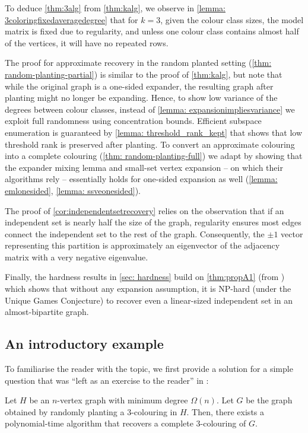 To deduce \cref{thm:3alg} from \cref{thm:kalg}, we observe in \cref{lemma: 3coloringfixedaveragedegree} that for $k=3$, given the colour class sizes, the model matrix is fixed due to regularity, and unless one colour class contains almost half of the vertices, it will have no repeated rows. 

The proof for approximate recovery in the random planted setting (\cref{thm: random-planting-partial}) is similar to the proof of \cref{thm:kalg}, but note that while the original graph is a one-sided expander, the resulting graph after planting might no longer be expanding. Hence, to show low variance of the degrees between colour classes, instead of \cref{lemma: expansionimpliesvariance} we exploit full randomness using concentration bounds. Efficient subspace enumeration is guaranteed by \cref{lemma: threshold_rank_kept} that shows that low threshold rank is preserved after planting. To convert an approximate colouring into a complete colouring (\cref{thm: random-planting-full}) we adapt \cite{MR3536556-David16} by showing that the expander mixing lemma and small-set vertex expansion -- on which their algorithms rely -- essentially holds for one-sided expansion as well (\cref{lemma: emlonesided}, \cref{lemma: ssveonesided}).

The proof of \cref{cor:independentsetrecovery} relies on the observation that if an independent set is nearly half the size of the graph, regularity ensures most edges connect the independent set to the rest of the graph. Consequently, the $\pm 1$ vector representing this partition is approximately an eigenvector of the adjacency matrix with a very negative eigenvalue.

Finally, the hardness results in \cref{sec: hardness} build on \cref{thm:propA1} (from \cite{bafna-hsieh-kothari}) which shows that without any expansion assumption, it is NP-hard (under the Unique Games Conjecture) to recover even a linear-sized independent set in an almost-bipartite graph.

\subsection{An introductory example}

To familiarise the reader with the topic, we first provide a solution for a simple question that was ``left as an exercise to the reader'' in \cite{MR3536556-David16}:

\begin{lemma}
    \label{lemma: lineardegree}
    Let $H$ be an $n$-vertex graph with minimum degree $\Omega(n)$. Let $G$ be the graph obtained by randomly planting a $3$-colouring in $H$.
    Then, there exists a polynomial-time algorithm that \whp recovers a complete $3$-colouring of $G$.
\end{lemma}

